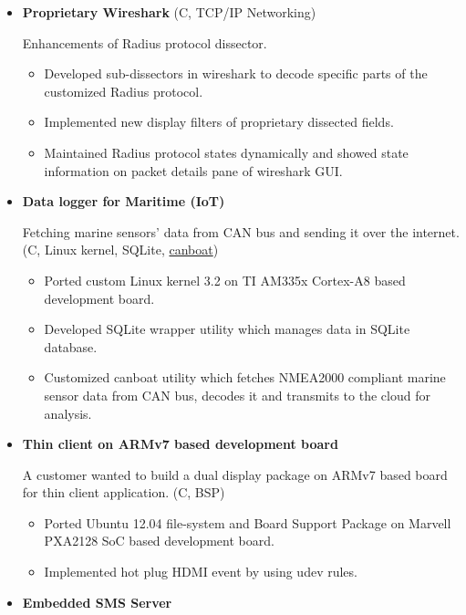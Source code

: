 \documentclass[letterpaper,11pt]{article}
\newcommand{\resitem}[1]{\item #1 \vspace{-2pt}}
\begin{document}
\begin{itemize}
\item
    \textbf{Proprietary Wireshark} (C, TCP/IP Networking)
    
    Enhancements of Radius protocol dissector. 
    
	\begin{itemize}
	    \resitem{Developed sub-dissectors in wireshark to decode specific parts of the customized Radius protocol.}
	    \resitem{Implemented new display filters of proprietary dissected fields.}
	    \resitem{Maintained Radius protocol states dynamically and showed state information on packet details pane of wireshark GUI.}
	   	\end{itemize}
\item
    \textbf{Data logger for Maritime (IoT)}
	
    Fetching marine sensors' data from CAN bus and sending it over the internet. (C, Linux kernel, SQLite, \href{https://github.com/mehul-m-prajapati/canboat}{canboat})
    
	\begin{itemize}
	    \resitem{Ported custom Linux kernel 3.2 on TI AM335x Cortex-A8 based development board.}
	    
	    \resitem{Developed SQLite wrapper utility which manages data in SQLite database.}
	    
	    \resitem{Customized canboat utility which fetches NMEA2000 compliant marine sensor data from CAN bus, decodes it and transmits to the cloud for analysis.}

	\end{itemize}

\item
    \textbf{Thin client on ARMv7 based development board}
    
    A customer wanted to build a dual display package on ARMv7 based board for thin client application. (C, BSP)
	\begin{itemize}
	    \resitem{Ported Ubuntu 12.04 file-system and Board Support Package on Marvell PXA2128 SoC based development board.}
	    
	    \resitem{Implemented hot plug HDMI event by using udev rules.}
	    
	\end{itemize}

\item
    \textbf{Embedded SMS Server}
    

\end{itemize}
\end{document}
